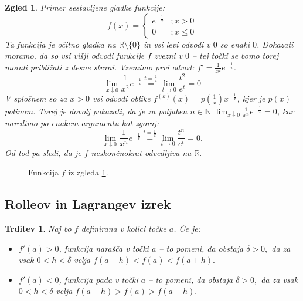 \documentclass[10pt, a4paper]{article}
\newtheorem{trditev}[izr]{Trditev}
\newtheorem{zgled}[izr]{Zgled}
\newcommand{\N}{\mathbb {N}}
\newcommand{\R}{\mathbb {R}}
\newcommand{\limf}[3]{\lim_{#1 \to #2} {#3}}
\newcommand{\rlimf}[3]{\lim_{#1 \downarrow #2} {#3}}
\begin{document}
\begin{zgled}
    \label{zgl:3}
    Primer sestavljene gladke funkcije:
    $$f(x) = \begin{cases}
        e^{-\frac{1}{x}} &; x > 0\\
        0 &; x \leq 0
    \end{cases}$$
    Ta funkcija je očitno gladka na $\R \setminus \{0\}$ in vsi levi odvodi v $0$ so enaki $0$.
    Dokazati moramo, da so vsi višji odvodi funkcije $f$ zvezni v $0$ -- tej točki se bomo torej morali približati z desne strani.
    Vzemimo prvi odvod: $f' =\frac{1}{x^2} e^{-\frac{1}{x}}.$
    $$\rlimf{x}{0}{\frac{1}{x^2} e^{-\frac{1}{x}}} \stackrel{t = \frac{1}{x}}{=} \limf{t}{0}{\frac{t^2}{e^t}} = 0$$
    V splošnem so za $x > 0$ vsi odvodi oblike $f^{(k)} (x) = p (\frac{1}{x}) x^{-\frac{1}{x}}$, kjer je $p(x)$ polinom.
    Torej je dovolj pokazati, da je za poljuben $n \in \N$ $\rlimf{x}{0}{\frac{1}{x^n} e^{-\frac{1}{x}}} = 0$, kar naredimo po enakem argumentu kot zgoraj:
    $$\rlimf{x}{0}{\frac{1}{x^n} e^{-\frac{1}{x}}} \stackrel{t = \frac{1}{x}}{=} \limf{t}{0}{\frac{t^n}{e^t}} = 0.$$
    Od tod pa sledi, da je $f$ neskončnokrat odvedljiva na $\R.$
\end{zgled}

\begin{figure}[hbt!]
    \centering
    \caption{Funkcija $f$ iz zgleda \ref{zgl:3}.}
\end{figure}

\subsection{Rolleov in Lagrangev izrek}

\begin{trditev}
    Naj bo $f$ definirana v kolici točke $a$. Če je:
    \begin{itemize}
        \item $f'(a) > 0$, funkcija narašča v točki $a$ -- 
        to pomeni, da obstaja $\delta > 0,$ da za vsak $0 < h < \delta$ velja $f(a-h) < f(a) < f(a+h).$
        \item $f'(a) < 0$, funkcija pada v točki $a$ -- 
        to pomeni, da obstaja $\delta > 0,$ da za vsak $0 < h < \delta$ velja $f(a-h) > f(a) > f(a+h).$
    \end{itemize}
\end{trditev}
\end{document}
